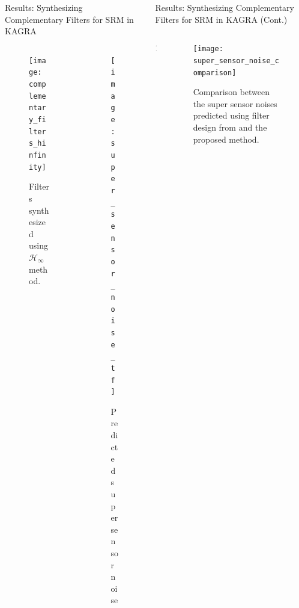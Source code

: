 \documentclass{beamer}
\begin{document}
\begin{frame}[t]
\begin{columns}[t]
\begin{column}{0.32\linewidth}
\begin{block}{Results: Synthesizing Complementary Filters for SRM in KAGRA}
				\begin{columns}[onlytextwidth]
					\begin{column}{0.5\textwidth}
						\begin{figure}
							\centering
							\texttt{[image: complementary\_filters\_hinfinity]}
							\caption{Filters synthesized using $\mathcal{H}_\infty$ method.}
							\label{fig:complementary_filters_hinfinity}
						\end{figure}
					\end{column}
					\begin{column}{0.5\textwidth}
						\begin{figure}
							\centering
							\texttt{[image: super\_sensor\_noise\_tf]}
							\caption{Predicted super sensor noise}
							\label{fig:super_sensor_noise_tf}
						\end{figure}
					\end{column}
				\end{columns}
			\end{block}

		\end{column}
	
		\begin{column}{0.32\linewidth}
			\begin{block}{Results: Synthesizing Complementary Filters for SRM in KAGRA (Cont.)}
			
			\begin{columns}[onlytextwidth]
				\begin{column}{0.45\textwidth}
					1
				\end{column}
				\begin{column}{0.5\textwidth}
					\begin{figure}
						\centering
						\texttt{[image: super\_sensor\_noise\_comparison]}
						\caption{Comparison between the super sensor noises predicted using filter design from \cite{Sekiguchi:2016bmv, vanHeijningen:2018cpc} and the proposed method.}
						\label{fig:super_sensor_noise_comparison}
					\end{figure}
				\end{column}
			\end{columns}

			\medskip
			

\end{block}
\end{column}
\end{columns}
\end{frame}
\end{document}
